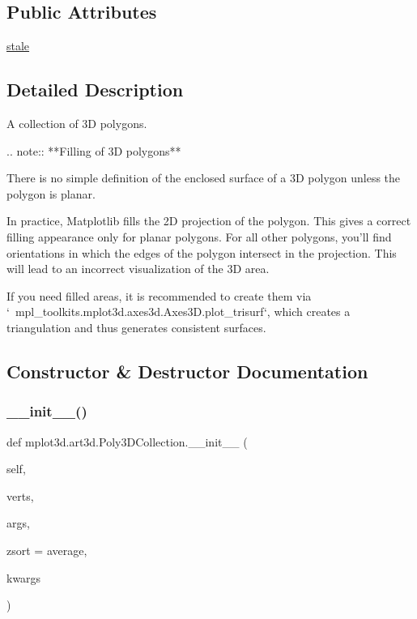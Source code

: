 \subsection*{Public Attributes}
\begin{DoxyCompactItemize}
\item 
\hyperlink{classmplot3d_1_1art3d_1_1Poly3DCollection_aa3b22f8300418e7eac479beef44f41c9}{stale}
\end{DoxyCompactItemize}


\subsection{Detailed Description}
\begin{DoxyVerb}A collection of 3D polygons.

.. note::
    **Filling of 3D polygons**

    There is no simple definition of the enclosed surface of a 3D polygon
    unless the polygon is planar.

    In practice, Matplotlib fills the 2D projection of the polygon. This
    gives a correct filling appearance only for planar polygons. For all
    other polygons, you'll find orientations in which the edges of the
    polygon intersect in the projection. This will lead to an incorrect
    visualization of the 3D area.

    If you need filled areas, it is recommended to create them via
    `~mpl_toolkits.mplot3d.axes3d.Axes3D.plot_trisurf`, which creates a
    triangulation and thus generates consistent surfaces.
\end{DoxyVerb}
 

\subsection{Constructor \& Destructor Documentation}
\mbox{\label{classmplot3d_1_1art3d_1_1Poly3DCollection_a7cec4a76a7d728f590eff00292460ae6}} 
\subsubsection{\texorpdfstring{\+\_\+\+\_\+init\+\_\+\+\_\+()}{\_\_init\_\_()}}
{\footnotesize\ttfamily def mplot3d.\+art3d.\+Poly3\+D\+Collection.\+\_\+\+\_\+init\+\_\+\+\_\+ (\begin{DoxyParamCaption}\item[{}]{self,  }\item[{}]{verts,  }\item[{}]{args,  }\item[{}]{zsort = {\ttfamily \textquotesingle{}average\textquotesingle{}},  }\item[{}]{kwargs }\end{DoxyParamCaption})}

